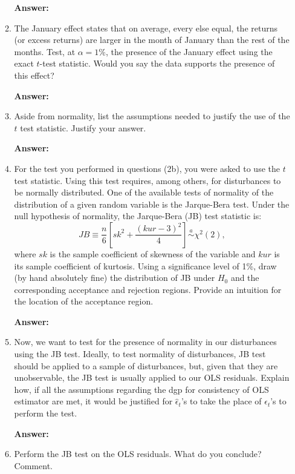 \documentclass[12pt,a4paper]{article}
\begin{document}
\begin{enumerate}[label=(\roman*)]
\begin{enumerate}[label=(\alph*)]
  \textbf{Answer:} 

  
  
  \item The January effect states that on average, every else equal, the returns (or excess returns) are larger in the month of January than the rest of the months. Test, at $\alpha = 1\%$, the presence of the January effect using the exact $t$-test statistic. Would you say the data supports the presence of this effect?
  
  \textbf{Answer:} 
  
  \item Aside from normality, list the assumptions needed to justify the use of the $t$ test statistic. Justify your answer.
  
  \textbf{Answer:} 
  
  \item For the test you performed in questions (2b), you were asked to use the $t$ test statistic. Using this test requires, among others, for disturbances to be normally distributed. One of the available tests of normality of the distribution of a given random variable is the Jarque-Bera test. Under the null hypothesis of normality, the Jarque-Bera (JB) test statistic is:
  \[
  JB \equiv \frac{n}{6}\left[sk^2 + \frac{(kur - 3)^2}{4}\right] \stackrel{a}{\sim} \chi^2(2),
  \]
  where $sk$ is the sample coefficient of skewness of the variable and $kur$ is its sample coefficient of kurtosis. Using a significance level of 1\%, draw (by hand absolutely fine) the distribution of JB under $H_0$ and the corresponding acceptance and rejection regions. Provide an intuition for the location of the acceptance region.
  
  \textbf{Answer:} 
  
  \item Now, we want to test for the presence of normality in our disturbances using the JB test. Ideally, to test normality of disturbances, JB test should be applied to a sample of disturbances, but, given that they are unobservable, the JB test is usually applied to our OLS residuals. Explain how, if all the assumptions regarding the dgp for consistency of OLS estimator are met, it would be justified for $\hat{\epsilon}_t$'s to take the place of $\epsilon_t$'s to perform the test.
  
  \textbf{Answer:} 
  
  \item Perform the JB test on the OLS residuals. What do you conclude? Comment.
  

\end{enumerate}
\end{enumerate}
\end{document}
